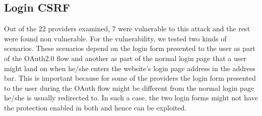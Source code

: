 \subsection{Login CSRF}
Out of the 22 providers examined, 7 were vulnerable to this attack and the rest were found non vulnerable. For the vulnerability, we tested two kinds of scenarios. These scenarios depend on the login form presented to the user as part of the OAuth2.0 flow and another as part of the normal login page that a user might land on when he/she enters the website's login page address in the address bar. This is important because for some of the providers the login form presented to the user during the OAuth flow might be different from the normal login page he/she is usually redirected to. In such a case, the two login forms might not have the protection enabled in both and hence can be exploited. 
